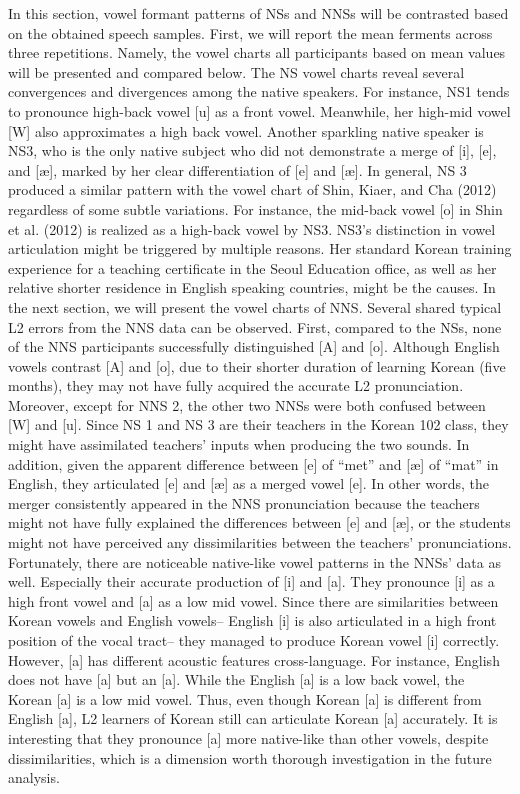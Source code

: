 \documentclass[man, fleqn, noextraspace]{apa6}
\begin{document}
In this section, vowel formant patterns of NSs and NNSs will be
contrasted based on the obtained speech samples. First, we will report
the mean ferments across three repetitions. Namely, the vowel charts all
participants based on mean values will be presented and compared below.
The NS vowel charts reveal several convergences and divergences among
the native speakers. For instance, NS1 tends to pronounce high-back
vowel {[}u{]} as a front vowel. Meanwhile, her high-mid vowel {[}W{]}
also approximates a high back vowel. Another sparkling native speaker is
NS3, who is the only native subject who did not demonstrate a merge of
{[}i{]}, {[}e{]}, and {[}æ{]}, marked by her clear differentiation of
{[}e{]} and {[}æ{]}. In general, NS 3 produced a similar pattern with
the vowel chart of Shin, Kiaer, and Cha (2012) regardless of some subtle
variations. For instance, the mid-back vowel {[}o{]} in Shin et al.
(2012) is realized as a high-back vowel by NS3. NS3's distinction in
vowel articulation might be triggered by multiple reasons. Her standard
Korean training experience for a teaching certificate in the Seoul
Education office, as well as her relative shorter residence in English
speaking countries, might be the causes. In the next section, we will
present the vowel charts of NNS. Several shared typical L2 errors from
the NNS data can be observed. First, compared to the NSs, none of the
NNS participants successfully distinguished {[}A{]} and {[}o{]}.
Although English vowels contrast {[}A{]} and {[}o{]}, due to their
shorter duration of learning Korean (five months), they may not have
fully acquired the accurate L2 pronunciation. Moreover, except for NNS
2, the other two NNSs were both confused between {[}W{]} and {[}u{]}.
Since NS 1 and NS 3 are their teachers in the Korean 102 class, they
might have assimilated teachers' inputs when producing the two sounds.
In addition, given the apparent difference between {[}e{]} of
\enquote{met} and {[}æ{]} of \enquote{mat} in English, they articulated
{[}e{]} and {[}æ{]} as a merged vowel {[}e{]}. In other words, the
merger consistently appeared in the NNS pronunciation because the
teachers might not have fully explained the differences between {[}e{]}
and {[}æ{]}, or the students might not have perceived any
dissimilarities between the teachers' pronunciations. Fortunately, there
are noticeable native-like vowel patterns in the NNSs' data as well.
Especially their accurate production of {[}i{]} and {[}a{]}. They
pronounce {[}i{]} as a high front vowel and {[}a{]} as a low mid vowel.
Since there are similarities between Korean vowels and English vowels--
English {[}i{]} is also articulated in a high front position of the
vocal tract-- they managed to produce Korean vowel {[}i{]} correctly.
However, {[}a{]} has different acoustic features cross-language. For
instance, English does not have {[}a{]} but an {[}a{]}. While the
English {[}a{]} is a low back vowel, the Korean {[}a{]} is a low mid
vowel. Thus, even though Korean {[}a{]} is different from English
{[}a{]}, L2 learners of Korean still can articulate Korean {[}a{]}
accurately. It is interesting that they pronounce {[}a{]} more
native-like than other vowels, despite dissimilarities, which is a
dimension worth thorough investigation in the future analysis.
\end{document}
